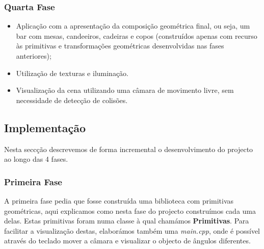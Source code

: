 \documentclass[a5paper,onecolumn, 11pt]{article}
\begin{document}
\subsubsection{Quarta Fase}
\begin{itemize}
    \item{Aplicação com a apresentação da composição geométrica final, ou seja, um bar com mesas, candeeiros, cadeiras e copos (construídos apenas com recurso às primitivas e transformações geométricas desenvolvidas nas fases anteriores);}
    \item{Utilização de texturas e iluminação.}
    \item{Visualização da cena utilizando uma câmara de movimento livre, sem necessidade de detecção de colisões.}
\end{itemize}
\newpage
\subsection{Implementação}
Nesta seccção descrevemos de forma incremental o desenvolvimento do projecto ao longo das 4 fases.
\subsubsection{Primeira Fase}
A  primeira fase  pedia que fosse construída uma biblioteca com primitivas  geométricas, aqui explicamos  como nesta fase do projecto construímos cada uma delas. Estas primitivas foram numa classe à qual chamámos \textbf{Primitivas}. Para facilitar a visualização destas, elaborámos também uma \textit{main.cpp}, onde é possível através do teclado mover a câmara e visualizar o objecto de ângulos diferentes.
\end{document}
